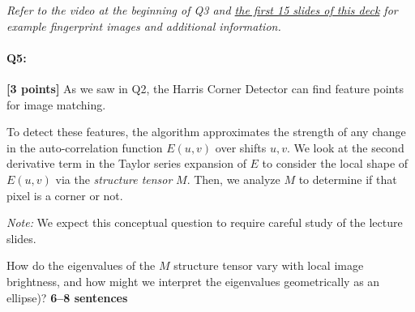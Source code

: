 \documentclass{csci1430}
\begin{document}
\begin{enumerate}[(a)]
\begin{tcolorbox}[colback=orange!5!white,colframe=orange!75!black]
    \emph{Refer to the video at the beginning of Q3 and \href{http://biometrics.cse.msu.edu/Presentations/AnilJain_UniquenessOfFingerprints_NAS05.pdf}{the first 15 slides of this deck} for example fingerprint images and additional information.}
    \end{tcolorbox}


\end{enumerate}

\pagebreak




\pagebreak
\paragraph{Q5:} \textbf{[3 points]}
As we saw in Q2, the Harris Corner Detector can find feature points for image matching.

To detect these features, the algorithm approximates the strength of any change in the auto-correlation function $E(u, v)$ over shifts $u,v$. We look at the second derivative term in the Taylor series expansion of $E$ to consider the local shape of $E(u, v)$ via the \emph{structure tensor} $M$. Then, we analyze $M$ to determine if that pixel is a corner or not.

\textit{Note:} We expect this conceptual question to require careful study of the lecture slides.

\begin{tcolorbox}[colback=orange!5!white,colframe=orange!75!black]
How do the eigenvalues of the $M$ structure tensor vary with local image brightness, and how might we interpret the eigenvalues geometrically as an ellipse)? \textbf{6--8 sentences}
\end{tcolorbox}

\end{document}
